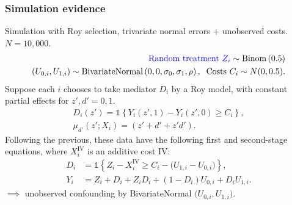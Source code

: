 \documentclass[dvipsnames]{beamer} %
\renewcommand{\vec}[1]{\boldsymbol{\mathit{#1}}}                           %
\newcommand{\indicator}[1]{\mathds{1}\left\{ #1 \right\}}                  %
\begin{document}
\begin{frame}
    \frametitle{Simulation evidence}
    Simulation with Roy selection, trivariate normal errors $+$ unobserved costs.
    $N = 10,000$.
    \begin{align*}
        \text{\textcolor{blue}{Random treatment $Z_i$}}
            \sim \text{Binom}\left(0.5 \right)\\
        \left( U_{0,i}, U_{1,i} \right) \sim
        \text{BivariateNormal}\left( 0, 0, \sigma_0, \sigma_1, \rho \right),
        \;\; \text{Costs }C_i \sim N(0, 0.5).
    \end{align*}    
    Suppose each $i$ chooses to take mediator $D_i$ by a Roy model, with constant partial effects for $z', d' = 0, 1$.
    \begin{align*}
        D_i(z') = \indicator{Y_i(z', 1) - Y_i(z', 0) \geq C_i},  \\
        \mu_{d'}\left(z' ; \vec X_i \right) = \left( z' + d' + z' d' \right).
    \end{align*}
    Following the previous, these data have the following first and second-stage equations, where $\vec X_i^\text{IV}$ is an additive cost IV:
    \begin{align*}
        D_i &= \indicator{Z_i - \vec X_i^{\text{IV}}
            \geq C_i - \Big( U_{1,i} - U_{0,i} \Big)},  \\
        Y_i &= Z_i + D_i + Z_i D_i
            + \left( 1 - D_i \right) U_{0,i} + D_i U_{1,i}.
    \end{align*}
    $\implies$ unobserved confounding by BivariateNormal $\Big(U_{0,i}, U_{1,i}\Big)$.
\end{frame}
\end{document}
